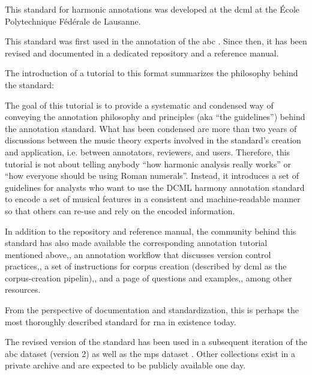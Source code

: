 

This standard for harmonic annotations was developed at the
\gls{dcml} at the \'Ecole Polytechnique F\'ed\'erale de
Lausanne.

This standard was first used in the annotation of the
\gls{abc}
\parencite{neuwirth2018annotated}. Since then, it has been
revised and documented in a dedicated
repository
and a reference
manual.

The introduction of a tutorial to this format summarizes the
philosophy behind the standard:

\begin{italicsquote}
    The goal of this tutorial is to provide a systematic and
    condensed way of conveying the annotation philosophy and
    principles (aka “the guidelines”) behind the annotation
    standard. What has been condensed are more than two
    years of discussions between the music theory experts
    involved in the standard's creation and application,
    i.e. between annotators, reviewers, and users.
    Therefore, this tutorial is not about telling anybody
    “how harmonic analysis really works” or “how everyone
    should be using Roman numerals”. Instead, it introduces
    a set of guidelines for analysts who want to use the
    DCML harmony annotation standard to encode a set of
    musical features in a consistent and machine-readable
    manner so that others can re-use and rely on the encoded
    information.
\end{italicsquote}

In addition to the repository and reference manual, the
community behind this standard has also made available the
corresponding annotation tutorial mentioned
above,,
an annotation workflow that discusses version control
practices,,
a set of instructions for corpus creation (described by
\gls{dcml} as the corpus-creation
pipelin),,
and a page of questions and
examples,,
among other resources.


From the perspective of documentation and standardization,
this is perhaps the most thoroughly described standard for
\gls{rna} in existence today.

The revised version of the standard has been used in a
subsequent iteration of the \gls{abc} dataset (version 2) as
well as the \gls{mps} dataset
\parencite{hentschel2021annotated}. Other collections exist
in a private archive and are expected to be publicly
available one day.
